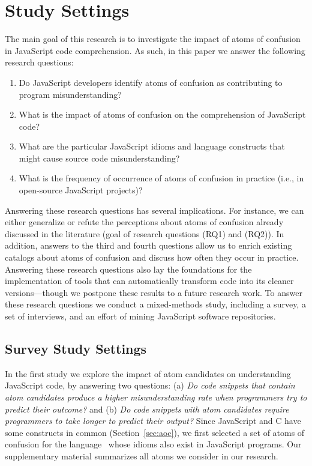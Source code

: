 \section{Study Settings}
\label{method}

The main goal of this research is to investigate the impact of atoms of confusion in JavaScript code comprehension. As such, in this paper we answer the following research questions: 

\begin{enumerate}[(RQ1)]
    \item Do JavaScript developers identify atoms of confusion as contributing to program misunderstanding? 
    \item What is the impact of atoms of confusion on the comprehension of JavaScript code? 
    \item What are the particular JavaScript idioms and language constructs that might cause source code misunderstanding?
    \item What is the frequency of occurrence of atoms of confusion in practice (i.e., in open-source JavaScript projects)?
\end{enumerate}

 
Answering these research questions has several implications. For instance, we can either generalize or refute the perceptions about atoms of confusion already discussed in the literature (goal of research questions (RQ1) and (RQ2)). In addition, answers to the third and fourth questions allow us to enrich existing catalogs about atoms of confusion and discuss how often they occur in practice. Answering these research questions also lay the foundations for the implementation of tools that can automatically transform code into its cleaner versions---though we postpone these results to a future research work. To answer these research questions we conduct a mixed-methods study, including a survey, a set of interviews, and an effort of mining JavaScript software repositories.  


\subsection{Survey Study Settings}



In the first study we explore the impact of atom candidates on
understanding JavaScript code, by answering two questions:
(a) \emph{Do code snippets that contain atom candidates
produce a higher misunderstanding rate when programmers
try to predict their outcome?}
and (b) \emph{Do code snippets with atom candidates require
programmers to take longer to predict their output?}
Since JavaScript and C have some constructs in common (Section~\ref{sec:aoc}), we first selected a set of atoms of confusion for the \clang language~\cite{DBLP:conf/sigsoft/GopsteinIYDZYC17} whose idioms also exist in JavaScript programs. Our supplementary material
summarizes all atoms we consider in our research. 

